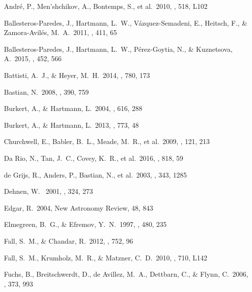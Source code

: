 \documentclass[iop]{emulateapj}
\begin{document}
\begin{thebibliography}

 Andr{\'e}, P., Men'shchikov, A., Bontemps, S., et al.\ 2010, \aap, 518, L102 


Ballesteros-Paredes, J., Hartmann, L.~W., V{\'a}zquez-Semadeni, E., 
Heitsch, F., \& Zamora-Avil{\'e}s, M.~A.\ 2011, \mnras, 411, 65 


Ballesteros-Paredes, J., Hartmann, L.~W., P{\'e}rez-Goytia, N., 
\& Kuznetsova, A.\ 2015, \mnras, 452, 566 


 Battisti, A.~J., \& Heyer, M.~H.\ 2014, \apj, 780, 173 


 Bastian, N.\ 2008, \mnras, 390, 759



 Burkert, A., \& Hartmann, L.\ 2004, \apj, 616, 288


 Burkert, A., \& Hartmann, L.\ 2013, \apj, 773, 48


 Churchwell, E., 
Babler, B.~L., Meade, M.~R., et al.\ 2009, \pasp, 121, 213 


 Da Rio, N., Tan, J.~C., Covey, K.~R., et al.\ 2016, \apj, 818, 59 

 de Grijs, R., Anders, 
P., Bastian, N., et al.\ 2003, \mnras, 343, 1285 


 Dehnen, W. \ 2001, \mnras, 324, 273

 Edgar, R.\ 2004, New Astronomy Review, 48, 843 

 Elmegreen, B.~G., \& Efremov, Y.~N.\ 1997, \apj, 480, 235 


 Fall, S.~M., \& Chandar, R.\ 2012, \apj, 752, 96 

 Fall, S.~M., Krumholz, 
M.~R., \& Matzner, C.~D.\ 2010, \apjl, 710, L142

 Fuchs, B., Breitschwerdt, 
D., de Avillez, M.~A., Dettbarn, C., \& Flynn, C.\ 2006, \mnras, 373, 993



\end{thebibliography}
\end{document}
